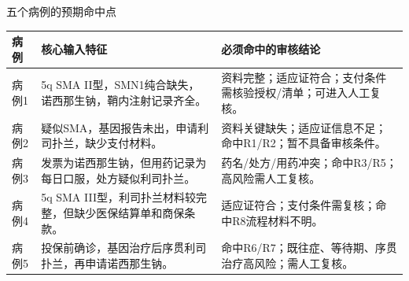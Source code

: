 
\begin{frame}[fragile]{五个病例的预期命中点}
  \footnotesize
  \begin{tabularx}{\textwidth}{l X X}
    \toprule
    病例 & 核心输入特征 & 必须命中的审核结论 \\
    \midrule
    病例1 & 5q SMA II型，SMN1纯合缺失，诺西那生钠，鞘内注射记录齐全。 & 资料完整；适应证符合；支付条件需核验授权/清单；可进入人工复核。 \\
    病例2 & 疑似SMA，基因报告未出，申请利司扑兰，缺少支付材料。 & 资料关键缺失；适应证信息不足；命中R1/R2；暂不具备审核条件。 \\
    病例3 & 发票为诺西那生钠，但用药记录为每日口服，处方疑似利司扑兰。 & 药名/处方/用药冲突；命中R3/R5；高风险需人工复核。 \\
    病例4 & 5q SMA III型，利司扑兰材料较完整，但缺少医保结算单和商保条款。 & 适应证符合；支付条件需复核；命中R8流程材料不明。 \\
    病例5 & 投保前确诊，基因治疗后序贯利司扑兰，再申请诺西那生钠。 & 命中R6/R7；既往症、等待期、序贯治疗高风险；需人工复核。 \\
    \bottomrule
  \end{tabularx}
\end{frame}

